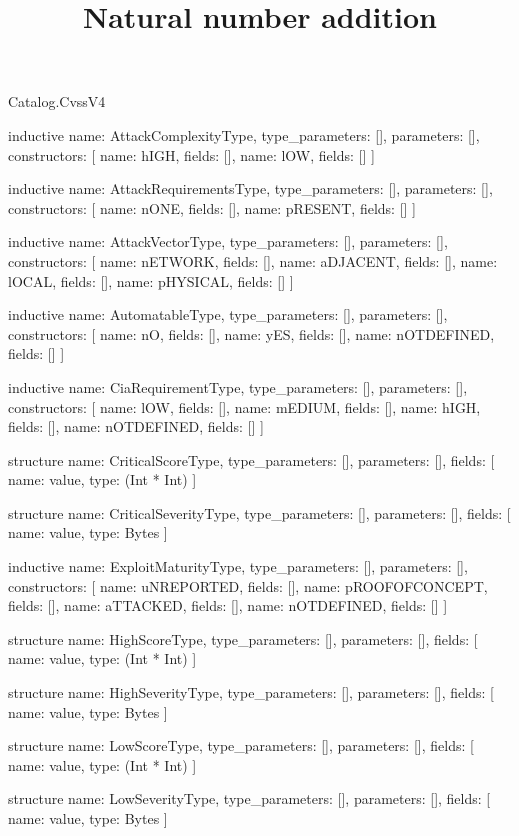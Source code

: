 \begin{lexlean}{Catalog.CvssV4}
\title{Natural number addition}
\begin{semanticmodule}
inductive{
  name: AttackComplexityType,
  type_parameters: [],
  parameters: [],
  constructors: [
    {name: hIGH, fields: []},
    {name: lOW, fields: []}
  ]
}

inductive{
  name: AttackRequirementsType,
  type_parameters: [],
  parameters: [],
  constructors: [
    {name: nONE, fields: []},
    {name: pRESENT, fields: []}
  ]
}

inductive{
  name: AttackVectorType,
  type_parameters: [],
  parameters: [],
  constructors: [
    {name: nETWORK, fields: []},
    {name: aDJACENT, fields: []},
    {name: lOCAL, fields: []},
    {name: pHYSICAL, fields: []}
  ]
}

inductive{
  name: AutomatableType,
  type_parameters: [],
  parameters: [],
  constructors: [
    {name: nO, fields: []},
    {name: yES, fields: []},
    {name: nOTDEFINED, fields: []}
  ]
}

inductive{
  name: CiaRequirementType,
  type_parameters: [],
  parameters: [],
  constructors: [
    {name: lOW, fields: []},
    {name: mEDIUM, fields: []},
    {name: hIGH, fields: []},
    {name: nOTDEFINED, fields: []}
  ]
}

structure{
  name: CriticalScoreType,
  type_parameters: [],
  parameters: [],
  fields: [
    {name: value, type: (Int * Int)}
  ]
}

structure{
  name: CriticalSeverityType,
  type_parameters: [],
  parameters: [],
  fields: [
    {name: value, type: Bytes}
  ]
}

inductive{
  name: ExploitMaturityType,
  type_parameters: [],
  parameters: [],
  constructors: [
    {name: uNREPORTED, fields: []},
    {name: pROOFOFCONCEPT, fields: []},
    {name: aTTACKED, fields: []},
    {name: nOTDEFINED, fields: []}
  ]
}

structure{
  name: HighScoreType,
  type_parameters: [],
  parameters: [],
  fields: [
    {name: value, type: (Int * Int)}
  ]
}

structure{
  name: HighSeverityType,
  type_parameters: [],
  parameters: [],
  fields: [
    {name: value, type: Bytes}
  ]
}

structure{
  name: LowScoreType,
  type_parameters: [],
  parameters: [],
  fields: [
    {name: value, type: (Int * Int)}
  ]
}

structure{
  name: LowSeverityType,
  type_parameters: [],
  parameters: [],
  fields: [
    {name: value, type: Bytes}
  ]
}


\end{semanticmodule}
\end{lexlean}
